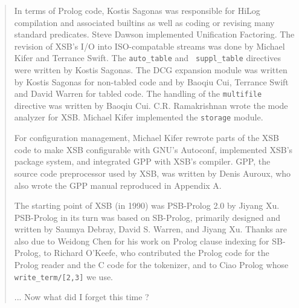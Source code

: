 \begin{quote}
In terms of Prolog code, Kostis Sagonas was responsible for HiLog
compilation and associated builtins as well as coding or revising many
standard predicates.  Steve Dawson implemented Unification Factoring.
The revision of XSB's I/O into ISO-compatable streams was done by
Michael Kifer and Terrance Swift.  The {\tt auto\_table} and {\tt
  suppl\_table} directives were written by Kostis Sagonas.  The DCG
expansion module was written by Kostis Sagonas for non-tabled code and
by Baoqiu Cui, Terrance Swift and David Warren for tabled code.  The
handling of the {\tt multifile} directive was written by Baoqiu
Cui. C.R. Ramakrishnan wrote the mode analyzer for XSB.  Michael Kifer
implemented the {\tt storage} module.

For configuration management, Michael Kifer rewrote parts of the XSB
code to make XSB configurable with GNU's Autoconf, implemented XSB's
package system, and integrated GPP with XSB's compiler.  GPP, the
source code preprocessor used by XSB, was written by Denis Auroux, who
also wrote the GPP manual reproduced in Appendix A.

The starting point of XSB (in 1990) was PSB-Prolog 2.0 by Jiyang Xu.
PSB-Prolog in its turn was based on SB-Prolog, primarily designed and
written by Saumya Debray, David S. Warren, and Jiyang Xu.  Thanks are
also due to Weidong Chen for his work on Prolog clause indexing for
SB-Prolog, to Richard O'Keefe, who contributed the Prolog code for the
Prolog reader and the C code for the tokenizer, and to Ciao Prolog
whose {\tt write\_term/[2,3]} we use.

... Now what did I forget this time ?

\end{quote}

